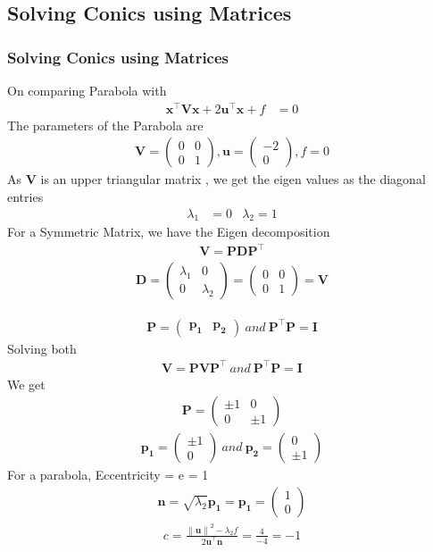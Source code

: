 \documentclass{beamer}
\theoremstyle{remark}
\providecommand{\norm}[1]{\lVert#1\rVert}
\newcommand{\myvec}[1]{\ensuremath{\begin{pmatrix}#1\end{pmatrix}}}
\let\vec\mathbf
\numberwithin{equation}{section}
\numberwithin{equation}{section}
\begin{document}
\subsection{Solving Conics using Matrices}
\begin{frame}
\frametitle{Solving Conics using Matrices}

On comparing Parabola  with
\begin{align}
\vec{x}^\top\vec{V}\vec{x} + 2\vec{u}^\top\vec{x} + f &= 0 \label{eq: conic}
\end{align}
The parameters of the Parabola are 
\begin{align}
\vec{V}=\myvec{0&0\\0&1} , \vec{u}=\myvec{-2\\0} , f=0
\end{align}
As $\vec{V}$ is an upper triangular matrix , we get the eigen values as the diagonal entries 
\begin{align}
  \lambda_1 &= 0 & \lambda_2 = 1
\end{align}
For a Symmetric Matrix, we have the Eigen decomposition
\begin{align}
\vec{V} = \vec{P}\vec{D}\vec{P}^\top
\end{align}
\begin{align}
\vec{D} = \myvec{\lambda_1&0\\0&\lambda_2} = \myvec{0&0\\0&1} = \vec{V}
\end{align}
\end{frame}
\begin{frame}
\begin{align}
\vec{P} = \myvec{\vec{p_1}&\vec{p_2}} \ and \ \vec{P}^\top\vec{P} = \vec{I} 
\end{align}
Solving both 
\begin{align}
\vec{V} = \vec{P}\vec{V}\vec{P}^\top \ and \ \vec{P}^\top\vec{P} = \vec{I}
\end{align}
We get
\begin{align}
\vec{P} = \myvec{\pm1&0\\0&\pm1}
\end{align}
\begin{align}
\vec{p_1} = \myvec{\pm1\\0} \ and \ \vec{p_2} = \myvec{0\\ \pm1}
\end{align}
For a parabola, Eccentricity = e = 1
\begin{align}
\vec{n} = \sqrt{\lambda_2}\vec{p_1} = \vec{p_1} = \myvec{1\\0}
\end{align}
\begin{align}
c = \frac{{\norm{\vec{u}}}^2 - \lambda_2 f}{2\vec{u}^\top\vec{n}} = \frac{4}{-4} = -1
\end{align}
\end{frame}
\end{document}
